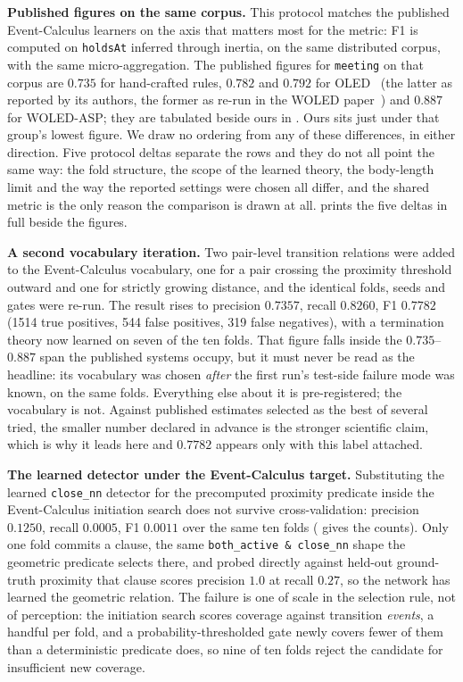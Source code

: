 \textbf{Published figures on the same corpus.} This protocol matches the published Event-Calculus learners on the axis that matters most for the metric: F1 is computed on \texttt{holdsAt} inferred through inertia, on the same distributed corpus, with the same micro-aggregation. The published figures for \texttt{meeting} on that corpus are $0.735$ for hand-crafted rules, $0.782$ and $0.792$ for OLED~\cite{oled} (the latter as reported by its authors, the former as re-run in the WOLED paper~\cite{woled}) and $0.887$ for WOLED-ASP; they are tabulated beside ours in . Ours sits just under that group's lowest figure. We draw no ordering from any of these differences, in either direction. Five protocol deltas separate the rows and they do not all point the same way: the fold structure, the scope of the learned theory, the body-length limit and the way the reported settings were chosen all differ, and the shared metric is the only reason the comparison is drawn at all.  prints the five deltas in full beside the figures.

\textbf{A second vocabulary iteration.} Two pair-level transition relations were added to the Event-Calculus vocabulary, one for a pair crossing the proximity threshold outward and one for strictly growing distance, and the identical folds, seeds and gates were re-run. The result rises to precision $0.7357$, recall $0.8260$, F1 $0.7782$ (1514 true positives, 544 false positives, 319 false negatives), with a termination theory now learned on seven of the ten folds. That figure falls inside the $0.735$--$0.887$ span the published systems occupy, but it must never be read as the headline: its vocabulary was chosen \emph{after} the first run's test-side failure mode was known, on the same folds. Everything else about it is pre-registered; the vocabulary is not. Against published estimates selected as the best of several tried, the smaller number declared in advance is the stronger scientific claim, which is why it leads here and $0.7782$ appears only with this label attached.

\textbf{The learned detector under the Event-Calculus target.} Substituting the learned \texttt{close\_nn} detector for the precomputed proximity predicate inside the Event-Calculus initiation search does not survive cross-validation: precision $0.1250$, recall $0.0005$, F1 $0.0011$ over the same ten folds ( gives the counts). Only one fold commits a clause, the same \texttt{both\_active \& close\_nn} shape the geometric predicate selects there, and probed directly against held-out ground-truth proximity that clause scores precision $1.0$ at recall $0.27$, so the network has learned the geometric relation. The failure is one of scale in the selection rule, not of perception: the initiation search scores coverage against transition \emph{events}, a handful per fold, and a probability-thresholded gate newly covers fewer of them than a deterministic predicate does, so nine of ten folds reject the candidate for insufficient new coverage.


